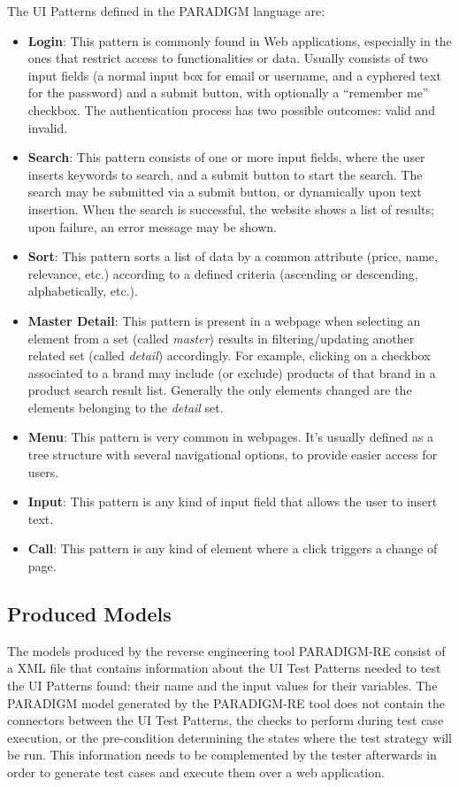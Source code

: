 \documentclass[conference]{IEEEtran}
\begin{document}
The UI Patterns defined in the PARADIGM language are:
\begin{itemize}
\item[] \textbf{Login}: This pattern is commonly found in Web applications, especially in the ones that restrict access to functionalities or data. Usually consists of two input fields (a normal input box for email or username, and a cyphered text for the password) and a submit button, with optionally a ``remember me'' checkbox. The authentication process has two possible outcomes: valid and invalid.
\item[] \textbf{Search}: This pattern consists of one or more input fields, where the user inserts keywords to search, and a submit button to start the search. The search may be submitted via a submit button, or dynamically upon text insertion. When the search is successful, the website shows a list of results; upon failure, an error message may be shown.
\item[] \textbf{Sort}: This pattern sorts a list of data by a common attribute (price, name, relevance, etc.) according to a defined criteria (ascending or descending, alphabetically, etc.).
\item[] \textbf{Master Detail}: This pattern is present in a webpage when selecting an element from a set (called \textit{master}) results in filtering/updating another related set (called \textit{detail}) accordingly. For example, clicking on a checkbox associated to a brand may include (or exclude) products of that brand in a product search result list. Generally the only elements changed are the elements belonging to the \textit{detail} set.
\item[] \textbf{Menu}: This pattern is very common in webpages. It's usually defined as a tree structure with several navigational options, to provide easier access for users. 
\item[] \textbf{Input}: This pattern is any kind of input field that allows the user to insert text.
\item[] \textbf{Call}: This pattern is any kind of element where a click triggers a change of page.
\end{itemize}

\subsection{Produced Models}

The models produced by the reverse engineering tool PARADIGM-RE consist of a XML file that contains information about the UI Test Patterns needed to test the UI Patterns found: their name and the input values for their variables. The PARADIGM model generated by the PARADIGM-RE tool does not contain the connectors between the UI Test Patterns, the checks to perform during test case execution, or the pre-condition determining the states where the test strategy will be run. This information needs to be complemented by the tester afterwards in order to generate test cases and execute them over a web application.
\end{document}
